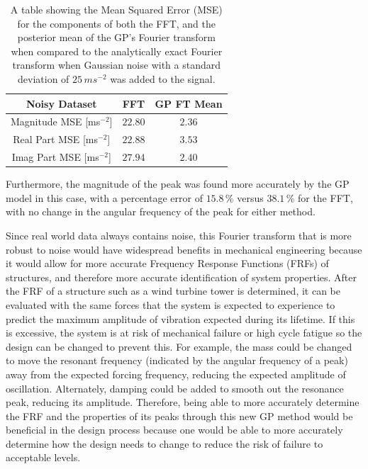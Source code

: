 \documentclass[12pt]{article}
\begin{document}
    \begin{table}[h]
        \centering %
        \setlength{\arrayrulewidth}{1pt} %
        \begin{tabular}{|c|c|c|} %
            \hline
            Noisy Dataset & FFT & GP FT Mean \\ %
            \hline
            Magnitude MSE [ms$^{-2}$] & $22.80$ & $2.36$ \\
            \hline
            Real Part MSE [ms$^{-2}$] & $22.88$ & $3.53$ \\
            \hline
            Imag Part MSE [ms$^{-2}$] & $27.94$ & $2.40$ \\
            \hline
        \end{tabular}
        \caption{A table showing the Mean Squared Error (MSE) for the components of both the FFT, and the posterior mean of the GP's Fourier transform when compared to the analytically exact Fourier transform when Gaussian noise with a standard deviation of $25 \, ms^{-2}$ was added to the signal.}
        \label{tab:response-noise}
    \end{table}

    Furthermore, the magnitude of the peak was found more accurately by the GP model in this case, with a percentage error of $15.8 \, \%$ versus $38.1 \, \%$ for the FFT, with no change in the angular frequency of the peak for either method.

    Since real world data always contains noise, this Fourier transform that is more robust to noise would have widespread benefits in mechanical engineering because it would allow for more accurate Frequency Response Functions (FRFs) of structures, and therefore more accurate identification of system properties.
    After the FRF of a structure such as a wind turbine tower is determined, it can be evaluated with the same forces that the system is expected to experience to predict the maximum amplitude of vibration expected during its lifetime.
    If this is excessive, the system is at risk of mechanical failure or high cycle fatigue so the design can be changed to prevent this.
    For example, the mass could be changed to move the resonant frequency (indicated by the angular frequency of a peak) away from the expected forcing frequency, reducing the expected amplitude of oscillation.
    Alternately, damping could be added to smooth out the resonance peak, reducing its amplitude.
    Therefore, being able to more accurately determine the FRF and the properties of its peaks through this new GP method would be beneficial in the design process because one would be able to more accurately determine how the design needs to change to reduce the risk of failure to acceptable levels.
\end{document}
